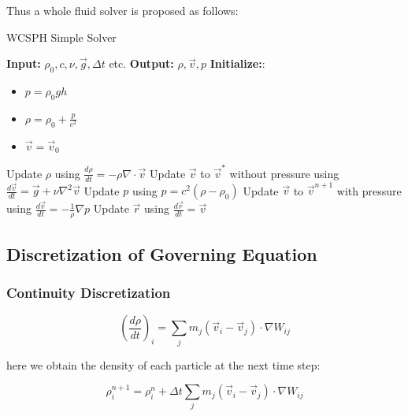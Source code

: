 \documentclass[10pt, oneside]{article}
\begin{document}
Thus a whole fluid solver is proposed as follows:

\begin{algorithm}[H]
    \caption{WCSPH Simple Solver}
    \begin{algorithmic}[1]
        \State \textbf{Input:} $\rho_0, c, \nu, \vec{g}, \Delta t$ etc.
        \State \textbf{Output:} $\rho, \vec{v}, p$
        \State \textbf{Initialize:}:
        \begin{itemize}
            \item $p = \rho_0 g h$
            \item $\rho = \rho_0 + \frac{p}{c^2}$
            \item $\vec{v} = \vec{v}_0$
        \end{itemize}
                \State Update $\rho$ using $\frac{d\rho}{dt}= -\rho \nabla\cdot \vec{v}$
            \EndFor
                \State Update $\vec{v}$ to $\vec{v}^*$ without pressure using $\frac{d\vec{v}}{dt}= \vec{g} + \nu \nabla^2 \vec{v}$
            \EndFor
                \State Update $p$ using $p = c^2(\rho - \rho_0)$
            \EndFor
                \State Update $\vec{v}$ to $\vec{v}^{n+1}$ with pressure using $\frac{d\vec{v}}{dt}= -\frac{1}{\rho}\nabla p$
                \State Update $\vec{r}$ using $\frac{d\vec{r}}{dt}= \vec{v}$
            \EndFor
        \EndWhile
    \end{algorithmic}
\end{algorithm}

\subsection{Discretization of Governing Equation}

\subsubsection{Continuity Discretization}

\begin{equation}
    \left(\frac{d\rho}{dt}\right)_i = 
    \sum_j m_j (\vec{v}_i-\vec{v}_j)\cdot \nabla W_{ij}
\end{equation}

here we obtain the density of each particle at the next time step:

\begin{equation}
    \rho_i^{n+1} = \rho_i^n + \Delta t \sum_j m_j (\vec{v}_i-\vec{v}_j)\cdot \nabla W_{ij}
\end{equation}
\end{document}
